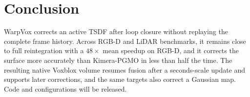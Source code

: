 \section{Conclusion}
WarpVox corrects an active TSDF after loop closure without replaying the
complete frame history. Across RGB-D and LiDAR benchmarks, it remains close
to full reintegration with a $48\times$ mean speedup on RGB-D, and it corrects
the surface more accurately than Kimera-PGMO in less than half the time. The
resulting native Voxblox volume resumes fusion after a seconds-scale update
and supports later corrections, and the same targets also correct a Gaussian
map. Code and configurations will be released.
